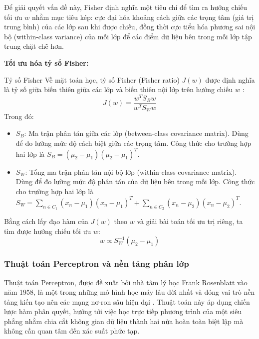 Để giải quyết vấn đề này, Fisher định nghĩa một tiêu chí để tìm ra hướng chiếu tối ưu $w$ nhằm mục tiêu kép: cực đại hóa khoảng cách giữa các trọng tâm (giá trị trung bình) của các lớp sau khi được chiếu, đồng thời cực tiểu hóa phương sai nội bộ (within-class variance) của mỗi lớp để các điểm dữ liệu bên trong mỗi lớp tập trung chặt chẽ hơn.

\textbf{Tối ưu hóa tỷ số Fisher:}

\begin{importantbox}{Tỷ số Fisher}
Về mặt toán học, tỷ số Fisher (Fisher ratio) $J(w)$ được định nghĩa là tỷ số giữa biến thiên giữa các lớp và biến thiên nội lớp trên hướng chiếu $w$ \cite{bishop2006pattern, welling2005fisher}:
\begin{equation}
    J(w) = \frac{w^T S_B w}{w^T S_W w}
\end{equation}
Trong đó:
\begin{itemize}
    \item $S_B$: Ma trận phân tán giữa các lớp (between-class covariance matrix). Dùng để đo lường mức độ cách biệt giữa các trọng tâm. Công thức cho trường hợp hai lớp là $S_B = (\mu_2 - \mu_1)(\mu_2 - \mu_1)^T$.
    \item $S_W$: Tổng ma trận phân tán nội bộ lớp (within-class covariance matrix). Dùng để đo lường mức độ phân tán của dữ liệu bên trong mỗi lớp. Công thức cho trường hợp hai lớp là $S_W = \sum_{n \in C_1} (x_n - \mu_1)(x_n - \mu_1)^T + \sum_{n \in C_2} (x_n - \mu_2)(x_n - \mu_2)^T$.
\end{itemize}

Bằng cách lấy đạo hàm của $J(w)$ theo $w$ và giải bài toán tối ưu trị riêng, ta tìm được hướng chiếu tối ưu $w$:
\begin{equation}
    w \propto S_W^{-1}(\mu_2 - \mu_1)
    \label{eq:fisher_w}
\end{equation}
\end{importantbox}

\subsubsection{Thuật toán Perceptron và nền tảng phân lớp}

Thuật toán Perceptron, được đề xuất bởi nhà tâm lý học Frank Rosenblatt vào năm 1958, là một trong những mô hình học máy lâu đời nhất và đóng vai trò nền tảng kiến tạo nên các mạng nơ-ron sâu hiện đại \cite{goodfellow2016deep}. Thuật toán này áp dụng chiến lược hàm phân quyết, hướng tới việc học trực tiếp phương trình của một siêu phẳng nhằm chia cắt không gian dữ liệu thành hai nửa hoàn toàn biệt lập mà không cần quan tâm đến xác suất phức tạp.

